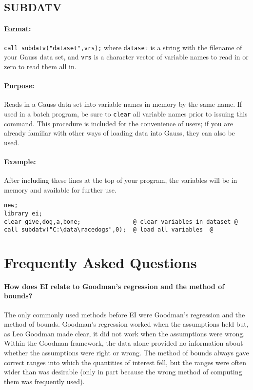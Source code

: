 \documentclass[11pt,titlepage]{article}
\begin{document}
\subsection{SUBDATV}\label{subdatv}

\paragraph{\underline{Format}:} \texttt{call subdatv("dataset",vrs);} where
\texttt{dataset} is a string with the filename of your Gauss data set,
and \texttt{vrs} is a character vector of variable names to read in or
zero to read them all in.

\paragraph{\underline{Purpose}:}
Reads in a Gauss data set into variable names in memory by the same
name.  If used in a batch program, be sure to \texttt{clear} all
variable names prior to issuing this command.  This procedure is
included for the convenience of users; if you are already familiar
with other ways of loading data into Gauss, they can also be used.

\paragraph{\underline{Example}:}
After including these lines at the top of your program, the variables
will be in memory and available for further use.
\begin{verbatim}
new;
library ei;
clear give,dog,a,bone;               @ clear variables in dataset @
call subdatv("C:\data\racedogs",0);  @ load all variables  @
\end{verbatim}

\section{Frequently Asked Questions}

\paragraph{How does EI relate to Goodman's regression and the method
  of bounds?}
The only commonly used methods before EI were Goodman's regression and
the method of bounds.  Goodman's regression worked when the
assumptions held but, as Leo Goodman made clear, it did not work when
the assumptions were wrong.  Within the Goodman framework, the data
alone provided no information about whether the assumptions were right
or wrong.  The method of bounds always gave correct ranges into which
the quantities of interest fell, but the ranges were often wider than
was desirable (only in part because the wrong method of computing them
was frequently used).
\end{document}
